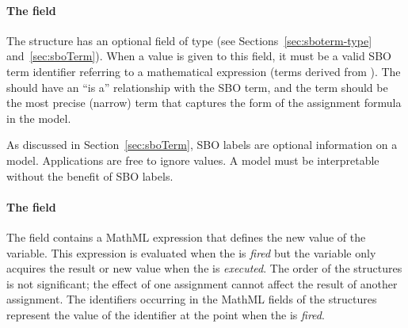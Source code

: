 \paragraph{The  field}

The \EventAssignment structure has an optional 
field of type  (see
Sections~\ref{sec:sboterm-type} and~\ref{sec:sboTerm}).  When a
value is given to this field, it must be a valid SBO term
identifier referring to a mathematical expression (\ie terms
derived from \sbomathformula).  The \EventAssignment should have
an ``is a'' relationship with the SBO term, and the term should be
the most precise (narrow) term that captures the form of the
assignment formula in the model.

As discussed in Section~\ref{sec:sboTerm}, SBO labels are optional
information on a model.  Applications are free to ignore
 values.  A model must be interpretable without the
benefit of SBO labels.


\paragraph{The  field}

The  field contains a MathML expression that defines
the new value of the variable. This expression is evaluated when
the \Event is \emph{fired} but the variable only acquires the
result or new value when the \Event is \emph{executed}. The order
of the \EventAssignment structures is not significant; the effect
of one assignment cannot affect the result of another assignment.
The identifiers occurring in the MathML  fields of the
\EventAssignment structures represent the value of the identifier
at the point when the \Event is \emph{fired}.

